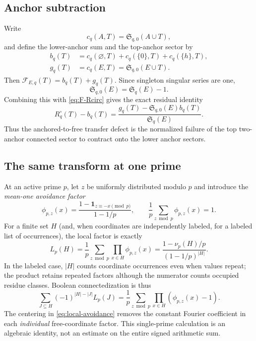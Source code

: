 \documentclass[11pt]{article}
\theoremstyle{definition}
\theoremstyle{remark}
\newcommand{\SSer}{\mathfrak S}
\newcommand{\1}{\mathbf 1}
\newcommand{\Fcal}{\mathcal F}
\begin{document}
\subsection{Anchor subtraction}

Write
\[
c_q(A,T)=\SSer_{q,0}(A\cup T),
\]
and define the lower-anchor sum and the top-anchor sector by
\begin{align}
b_q(T)&=c_q(\varnothing,T)+c_q(\{0\},T)+c_q(\{h\},T),\label{eq:bq}\\
g_q(T)&=c_q(E,T)=\SSer_{q,0}(E\cup T).\label{eq:gq}
\end{align}
Then $\Fcal_{E,q}(T)=b_q(T)+g_q(T)$.  Since singleton singular series are one,
\[
\SSer_{q,0}(E)=\SSer_q(E)-1.
\]
Combining this with \eqref{eq:F-Rcirc} gives the exact residual identity
\begin{equation}\label{eq:anchor-residual}
\boxed{
R_q^\circ(T)-b_q(T)
=\frac{g_q(T)-\SSer_{q,0}(E)b_q(T)}{\SSer_q(E)}.
}
\end{equation}
Thus the anchored-to-free transfer defect is the normalized failure of the top two-anchor connected sector to contract onto the lower anchor sectors.

\subsection{The same transform at one prime}

At an active prime $p$, let $z$ be uniformly distributed modulo $p$ and
introduce the \emph{mean-one avoidance factor}
\begin{equation}\label{eq:local-avoidance}
 \phi_{p,z}(x)=\frac{1-\mathbf 1_{z\equiv -x\pmod p}}{1-1/p},
 \qquad \frac1p\sum_{z\bmod p}\phi_{p,z}(x)=1.
\end{equation}
For a finite set $H$ (and, when coordinates are independently labeled,
for a labeled list of occurrences), the local factor is exactly
\[
 L_p(H)=\frac1p\sum_{z\bmod p}\prod_{x\in H}\phi_{p,z}(x)
       =\frac{1-\nu_p(H)/p}{(1-1/p)^{|H|}}.
\]
In the labeled case, $|H|$ counts coordinate occurrences even when values
repeat; the product retains repeated factors although the numerator
counts occupied residue classes. Boolean connectedization is thus
\begin{equation}\label{eq:local-connected}
 \sum_{J\subseteq H}(-1)^{|H|-|J|}L_p(J)
    =\frac1p\sum_{z\bmod p}\prod_{x\in H}(\phi_{p,z}(x)-1).
\end{equation}
The centering in \eqref{eq:local-avoidance} removes the constant Fourier
coefficient in each \emph{individual} free-coordinate factor. This
single-prime calculation is an algebraic identity, not an estimate on
the entire signed arithmetic sum.
\end{document}
